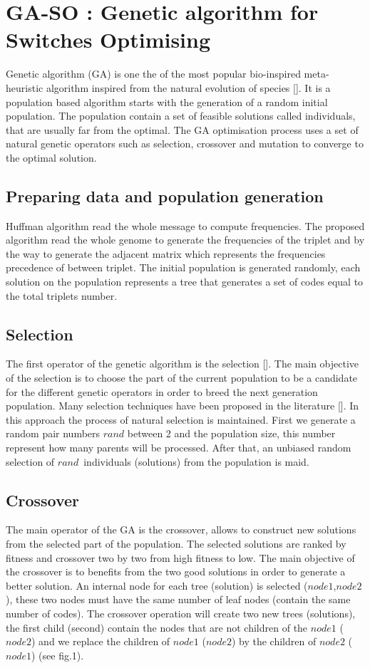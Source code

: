 \documentclass[preprint,12pt]{elsarticle}
\begin{document}
\section{GA-SO : Genetic algorithm for Switches Optimising}
Genetic algorithm (GA) is one the of the most popular bio-inspired meta-heuristic algorithm inspired from the natural evolution of species []. It is a  population based algorithm starts with the generation of a random initial population. The population contain a set of feasible solutions called individuals, that are usually far from the optimal. The GA optimisation process uses a set of natural genetic operators such as selection, crossover and mutation to converge to the optimal solution.
\subsection{Preparing data and population generation}
Huffman algorithm read the whole message to compute frequencies. The proposed algorithm read the whole genome to generate the frequencies of the triplet and by the way to generate the adjacent matrix which represents the frequencies precedence of between triplet. The initial population is generated randomly, each solution on the population represents a tree that generates a set of codes equal to the total triplets number.
\subsection{Selection}
The first operator of the genetic algorithm is the selection []. The main objective of the selection is to choose the part of the current  population to be a candidate for the different genetic operators in order to breed the next generation population. Many selection techniques have been proposed in the literature []. In this approach the  process of natural selection is maintained. First we generate a random pair numbers \textit{$rand$} between 2 and the population size, this number represent how many parents will be processed. After that, an unbiased random selection of \textit{$rand$}~individuals (solutions) from the population is maid. 
\subsection{Crossover}
The main operator of the GA is the crossover, allows to construct new solutions from the selected part of the population. The selected solutions are ranked by fitness and crossover two by two from high fitness to low. The main objective of the crossover is to benefits from the two good solutions in order to generate a better solution. An internal node for each tree (solution) is selected (\textit{$node1$},\textit{$node2$}), these two nodes must have the same number of leaf nodes (contain the same number of codes). The crossover operation will create two new trees (solutions), the first child (second) contain the nodes that are not children of the \textit{$node1$} (\textit{$node2$}) and we replace the children of \textit{$node1$} (\textit{$node2$}) by the children of \textit{$node2$} (\textit{$node1$}) (see fig.1). 
\end{document}
